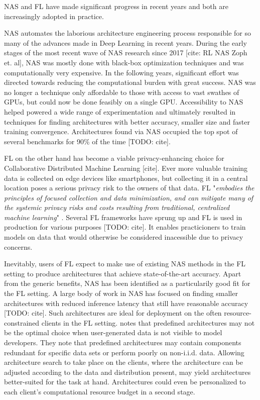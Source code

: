 NAS and FL have made significant progress in recent years and both are increasingly adopted in practice. 

NAS automates the laborious architecture engineering process responsible for so many of the advances made in Deep Learning in recent years. During the early stages of the most recent wave of NAS research since 2017 [cite: RL NAS Zoph et. al], NAS was mostly done with black-box optimization techniques and was computationally very expensive. In the following years, significant effort was directed towards reducing the computational burden with great success. NAS was no longer a technique only affordable to those with access to vast swathes of GPUs, but could now be done feasibly on a single GPU. Accessibility to NAS helped powered a wide range of experimentation and ultimately resulted in techniques for finding architectures with better accuracy, smaller size and faster training convergence. Architectures found via NAS occupied the top spot of several benchmarks for 90\% of the time [TODO: cite].

FL on the other hand has become a viable privacy-enhancing choice for Collaborative Distributed Machine Learning [cite]. Ever more valuable training data is collected on edge devices like smartphones, but collecting it in a central location poses a serious privacy risk to the owners of that data. FL "\textit{embodies the principles of focused collection and data minimization, and can mitigate many of the systemic privacy risks and costs resulting from traditional, centralized machine learning}" \cite{fl_advances_and_open_problems_2021}. Several FL frameworks have sprung up and FL is used in production for various purposes [TODO: cite]. It enables practicioners to train models on data that would otherwise be considered inacessible due to privacy concerns.  

Inevitably, users of FL expect to make use of existing NAS methods in the FL setting to produce architectures that achieve state-of-the-art accuracy. Apart from the generic benefits, NAS has been identified as a particularily good fit for the FL setting. A large body of work in NAS has focused on finding smaller architectures with reduced inference latency that still have reasonable accuracy [TODO: cite]. Such architectures are ideal for deployment on the often resource-constrained clients in the FL setting. \cite{fl_advances_and_open_problems_2021} notes that predefined architectures may not be the optimal choice when user-generated data is not visible to model developers. They note that predefined architectures may contain components redundant for specific data sets or perform poorly on non-i.i.d. data. Allowing architecture search to take place on the clients, where the architecture can be adjusted according to the data and distribution present, may yield architectures better-suited for the task at hand. Architectures could even be personalized to each client's computational resource budget in a second stage. 

